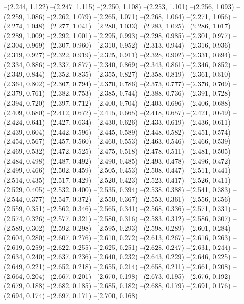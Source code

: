 {--(2.244, 1.122)
--(2.247, 1.115)
--(2.250, 1.108)
--(2.253, 1.101)
--(2.256, 1.093)
--(2.259, 1.086)
--(2.262, 1.079)
--(2.265, 1.071)
--(2.268, 1.064)
--(2.271, 1.056)
--(2.274, 1.048)
--(2.277, 1.041)
--(2.280, 1.033)
--(2.283, 1.025)
--(2.286, 1.017)
--(2.289, 1.009)
--(2.292, 1.001)
--(2.295, 0.993)
--(2.298, 0.985)
--(2.301, 0.977)
--(2.304, 0.969)
--(2.307, 0.960)
--(2.310, 0.952)
--(2.313, 0.944)
--(2.316, 0.936)
--(2.319, 0.927)
--(2.322, 0.919)
--(2.325, 0.911)
--(2.328, 0.902)
--(2.331, 0.894)
--(2.334, 0.886)
--(2.337, 0.877)
--(2.340, 0.869)
--(2.343, 0.861)
--(2.346, 0.852)
--(2.349, 0.844)
--(2.352, 0.835)
--(2.355, 0.827)
--(2.358, 0.819)
--(2.361, 0.810)
--(2.364, 0.802)
--(2.367, 0.794)
--(2.370, 0.786)
--(2.373, 0.777)
--(2.376, 0.769)
--(2.379, 0.761)
--(2.382, 0.753)
--(2.385, 0.744)
--(2.388, 0.736)
--(2.391, 0.728)
--(2.394, 0.720)
--(2.397, 0.712)
--(2.400, 0.704)
--(2.403, 0.696)
--(2.406, 0.688)
--(2.409, 0.680)
--(2.412, 0.672)
--(2.415, 0.665)
--(2.418, 0.657)
--(2.421, 0.649)
--(2.424, 0.641)
--(2.427, 0.634)
--(2.430, 0.626)
--(2.433, 0.619)
--(2.436, 0.611)
--(2.439, 0.604)
--(2.442, 0.596)
--(2.445, 0.589)
--(2.448, 0.582)
--(2.451, 0.574)
--(2.454, 0.567)
--(2.457, 0.560)
--(2.460, 0.553)
--(2.463, 0.546)
--(2.466, 0.539)
--(2.469, 0.532)
--(2.472, 0.525)
--(2.475, 0.518)
--(2.478, 0.511)
--(2.481, 0.505)
--(2.484, 0.498)
--(2.487, 0.492)
--(2.490, 0.485)
--(2.493, 0.478)
--(2.496, 0.472)
--(2.499, 0.466)
--(2.502, 0.459)
--(2.505, 0.453)
--(2.508, 0.447)
--(2.511, 0.441)
--(2.514, 0.435)
--(2.517, 0.429)
--(2.520, 0.423)
--(2.523, 0.417)
--(2.526, 0.411)
--(2.529, 0.405)
--(2.532, 0.400)
--(2.535, 0.394)
--(2.538, 0.388)
--(2.541, 0.383)
--(2.544, 0.377)
--(2.547, 0.372)
--(2.550, 0.367)
--(2.553, 0.361)
--(2.556, 0.356)
--(2.559, 0.351)
--(2.562, 0.346)
--(2.565, 0.341)
--(2.568, 0.336)
--(2.571, 0.331)
--(2.574, 0.326)
--(2.577, 0.321)
--(2.580, 0.316)
--(2.583, 0.312)
--(2.586, 0.307)
--(2.589, 0.302)
--(2.592, 0.298)
--(2.595, 0.293)
--(2.598, 0.289)
--(2.601, 0.284)
--(2.604, 0.280)
--(2.607, 0.276)
--(2.610, 0.272)
--(2.613, 0.267)
--(2.616, 0.263)
--(2.619, 0.259)
--(2.622, 0.255)
--(2.625, 0.251)
--(2.628, 0.247)
--(2.631, 0.244)
--(2.634, 0.240)
--(2.637, 0.236)
--(2.640, 0.232)
--(2.643, 0.229)
--(2.646, 0.225)
--(2.649, 0.221)
--(2.652, 0.218)
--(2.655, 0.214)
--(2.658, 0.211)
--(2.661, 0.208)
--(2.664, 0.204)
--(2.667, 0.201)
--(2.670, 0.198)
--(2.673, 0.195)
--(2.676, 0.192)
--(2.679, 0.188)
--(2.682, 0.185)
--(2.685, 0.182)
--(2.688, 0.179)
--(2.691, 0.176)
--(2.694, 0.174)
--(2.697, 0.171)
--(2.700, 0.168)
}
